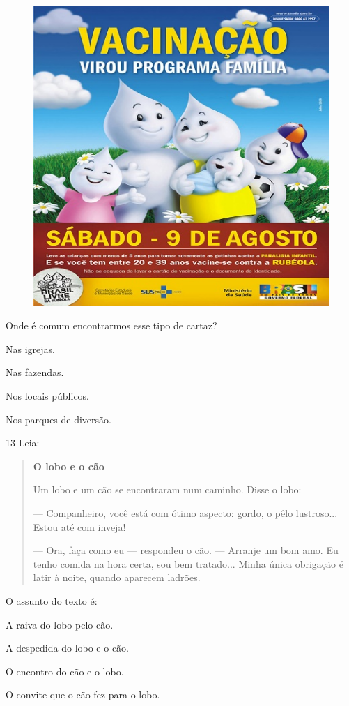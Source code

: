 \begin{figure}[htpb!]
\centering
\includegraphics[width=.5\textwidth]{media/image159.jpeg}
\end{figure}

Onde é comum encontrarmos esse tipo de cartaz?

\begin{escolha}
\item Nas igrejas.

\item Nas fazendas.

\item Nos locais públicos.

\item Nos parques de diversão.
\end{escolha}

\num{13} Leia:


\begin{quote}
\textbf{O lobo e o cão}

Um lobo e um cão se encontraram num caminho. Disse o lobo:

--- Companheiro, você está com ótimo aspecto: gordo, o pêlo lustroso...
Estou até com inveja!

--- Ora, faça como eu --- respondeu o cão. --- Arranje um bom amo.
Eu tenho comida na hora certa, sou bem tratado...
Minha única obrigação é latir à noite, quando aparecem ladrões.

\end{quote}

O assunto do texto é:

\begin{escolha}
\item A raiva do lobo pelo cão.

\item A despedida do lobo e o cão.

\item O encontro do cão e o lobo.

\item O convite que o cão fez para o lobo.
\end{escolha}


